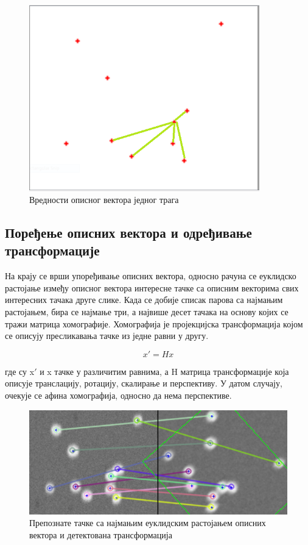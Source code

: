 \documentclass[12pt,a4paper,serbian,oneside]{book}
\begin{document}
\begin{figure}
\begin{center}
\includegraphics[width=100mm]{images/desc.png}
\end{center}
\caption{Вредности описног вектора једног трага}
\label{fig:desc}
\end{figure}

\subsection{Поређење описних вектора и одређивање трансформације}

На крају се врши упоређивање описних вектора, односно рачуна се еуклидско растојање између описног вектора интересне тачке са описним векторима свих интересних тачака друге слике.  Када се добије списак парова са најмањим растојањем, бира се најмање три, а највише десет тачака на основу којих се тражи матрица хомографије. Хомографија је пројекцијска трансформација којом се описују пресликавања тачке из једне равни у другу.

 \begin{equation}
x \prime = H x
\end{equation}

где су x$\prime$ и x тачке у различитим равнима, а H матрица трансформације која описује транслацију, ротацију, скалирање и перспективу. У датом случају, очекује се афина хомографија, односно да нема перспективе.

\begin{figure}[h]
\begin{center}
\includegraphics[width=150mm]{images/rotation.png}
\end{center}
\caption{Препознате тачке са најмањим еуклидским растојањем описних вектора и детектована трансформација}
\label{fig:rotation}
\end{figure}
\end{document}
